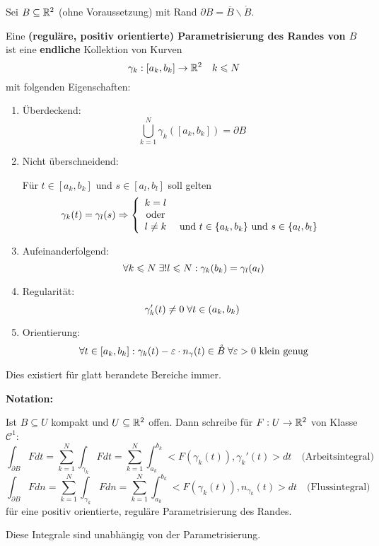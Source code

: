 \documentclass[main.tex]{subfiles}
\begin{document}
\begin{Definition}
  Sei $B \subseteq \mathbb{R}^2$ (ohne Voraussetzung) mit Rand $\partial B = \overline{B} \backslash \mathring{B}$.

  Eine \textbf{(reguläre, positiv orientierte) Parametrisierung des Randes von $B$} ist eine \textbf{endliche} Kollektion von Kurven
  $$\gamma_k : [a_k,b_k] \to \mathbb{R}^2 \quad k \leqslant N$$
  mit folgenden Eigenschaften:
  \begin{enumerate}
    \item Überdeckend:
      $$\bigcup \limits_{k=1}^N \gamma_k([a_k,b_k]) = \partial B$$
    \item Nicht überschneidend:

      Für $t \in [a_k,b_k]$ und $s \in [a_l,b_l]$ soll gelten
      $$\gamma_k(t) = \gamma_l(s)\Rightarrow \left\{\begin{array}{c c}
        k = l & \\
        \text{oder} & \\
        l \neq k & \text{ und } t \in \{a_k,b_k\} \text{ und } s \in \{a_l,b_l\}
      \end{array}\right.$$
    \item Aufeinanderfolgend:
      $$\;\forall k \leqslant N \;\exists! l \leqslant N : \gamma_k(b_k) = \gamma_l(a_l)$$
    \item Regularität:
      $$\gamma_k'(t) \neq 0 \;\forall t \in (a_k,b_k)$$
    \item Orientierung:
      $$\;\forall t \in [a_k,b_k] : \gamma_k(t) - \varepsilon \cdot n_\gamma(t) \in \mathring{B} \;\forall \varepsilon > 0 \text{ klein genug}$$
  \end{enumerate}
  Dies existiert für glatt berandete Bereiche immer.

  \textbf{Notation:}

  Ist $B \subseteq U$ kompakt und $U \subseteq \mathbb{R}^2$ offen. Dann schreibe für $F: U \to \mathbb{R}^2$ von Klasse $\mathcal{C}^1$:
  $$\int_{\partial B} F dt = \sum \limits_{k=1}^N \int_{\gamma_k}F dt = \sum \limits_{k=1}^N \int_{a_k}^{b_k} <F(\gamma_k(t)),\gamma_k'(t)> dt \quad \text{(Arbeitsintegral)}$$
  $$\int_{\partial B} F dn = \sum \limits_{k=1}^N \int_{\gamma_k}F dn = \sum \limits_{k=1}^N \int_{a_k}^{b_k} <F(\gamma_k(t)),n_{\gamma_k}(t)> dt \quad \text{(Flussintegral)}$$
  für eine positiv orientierte, reguläre Parametrisierung des Randes.
  \begin{Theorem}
    Diese Integrale sind unabhängig von der Parametrisierung.
  \end{Theorem}
\end{Definition}
\end{document}
